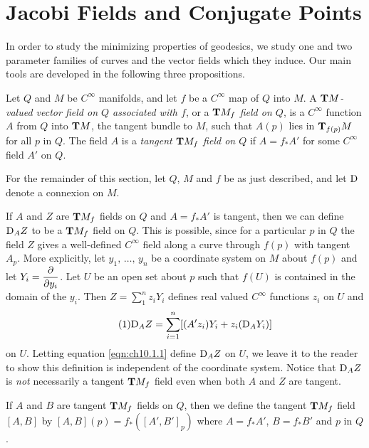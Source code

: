 \documentclass[../main]{subfiles}
\begin{document}
\section{Jacobi Fields and Conjugate Points}\label{ch10:s1}

In order to study the minimizing properties of geodesics, we study one and two parameter families of curves and the vector fields which they induce. Our main tools are developed in the following three propositions.

Let $Q$ and $M$ be $C^\infty$ manifolds, and let $f$ be a $C^\infty$ map of $Q$ into $M$. A \emph{$\tangentbundle{M}$-valued vector field on $Q$ associated with $f$}, or a \emph{$\tangentbundle{M}_f$ field on $Q$}, is a $C^\infty$ function $A$ from $Q$ into $\tangentbundle{M}$, the tangent bundle to $M$, such that $A(p)$ lies in $\tangentspace{M}{f(p)}$ for all $p$ in $Q$. The field $A$ is a \emph{tangent $\tangentbundle{M}_f$ field on $Q$} if $A=f_\ast A'$ for some $C^\infty$ field $A'$ on $Q$.

For the remainder of this section, let $Q$, $M$ and $f$ be as just described, and let $\connection$ denote a connexion on $M$.

If $A$ and $Z$ are $\tangentbundle{M}_f$ fields on $Q$ and $A=f_\ast A'$ is tangent, then we can define $\connection_A Z$ to be a $\tangentbundle{M}_f$ field on $Q$. This is possible, since for a particular $p$ in $Q$ the field $Z$ gives a well-defined $C^\infty$ field along a curve through $f(p)$ with tangent $A_p$. More explicitly, let $y_1,\, \hdots,\, y_n$ be a coordinate system on $M$ about $f(p)$ and let $Y_i=\pdv{}{y_i}$. Let $U$ be an open set about $p$ such that $f(U)$ is contained in the domain of the $y_i$. Then $Z=\displaystyle\sum_1^n z_i Y_i$ defines real valued $C^\infty$ functions $z_i$ on $U$ and
    \begin{equation}\tag{1} \label{eqn:ch10.1.1}
    \connection_A Z = \sum_{i=1}^n [(A'z_i)Y_i + z_i(\connection_A Y_i)]
    \end{equation}
on $U$. Letting equation \eqref{eqn:ch10.1.1} define $\connection_A Z$ on $U$, we leave it to the reader to show this definition is independent of the coordinate system. Notice that $\connection_A Z$ is \emph{not} necessarily a tangent $\tangentbundle{M}_f$ field even when both $A$ and $Z$ are tangent.

If $A$ and $B$ are tangent $\tangentbundle{M}_f$ fields on $Q$, then we define the tangent $\tangentbundle{M}_f$ field $[A,B]$ by $[A,B](p)=f_\ast([A',B']_p)$ where $A=f_\ast A'$, $B=f_\ast B'$ and $p$ in $Q$.
\end{document}

